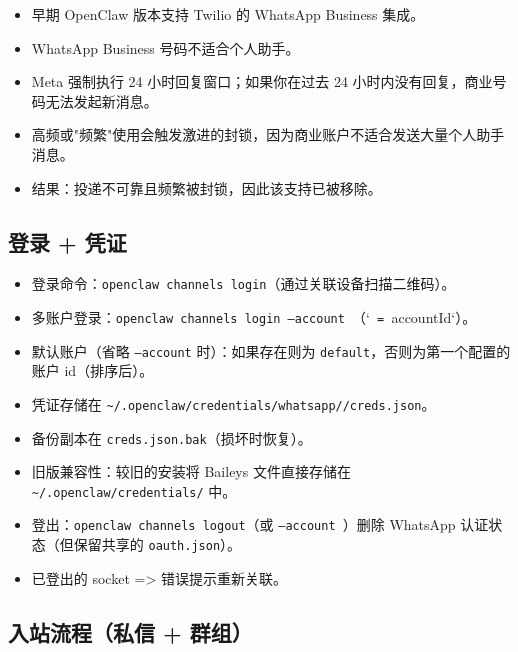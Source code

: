 \begin{itemize}
  \item 早期 OpenClaw 版本支持 Twilio 的 WhatsApp Business 集成。
  \item WhatsApp Business 号码不适合个人助手。
  \item Meta 强制执行 24 小时回复窗口；如果你在过去 24 小时内没有回复，商业号码无法发起新消息。
  \item 高频或"频繁"使用会触发激进的封锁，因为商业账户不适合发送大量个人助手消息。
  \item 结果：投递不可靠且频繁被封锁，因此该支持已被移除。
\end{itemize}


\subsection{登录 + 凭证}


\begin{itemize}
  \item 登录命令：\texttt{openclaw channels login}（通过关联设备扫描二维码）。
  \item 多账户登录：\texttt{openclaw channels login --account }（`\texttt{ = }accountId`）。
  \item 默认账户（省略 \texttt{--account} 时）：如果存在则为 \texttt{default}，否则为第一个配置的账户 id（排序后）。
  \item 凭证存储在 \texttt{\textasciitilde{}/.openclaw/credentials/whatsapp//creds.json}。
  \item 备份副本在 \texttt{creds.json.bak}（损坏时恢复）。
  \item 旧版兼容性：较旧的安装将 Baileys 文件直接存储在 \texttt{\textasciitilde{}/.openclaw/credentials/} 中。
  \item 登出：\texttt{openclaw channels logout}（或 \texttt{--account }）删除 WhatsApp 认证状态（但保留共享的 \texttt{oauth.json}）。
  \item 已登出的 socket => 错误提示重新关联。
\end{itemize}


\subsection{入站流程（私信 + 群组）}


